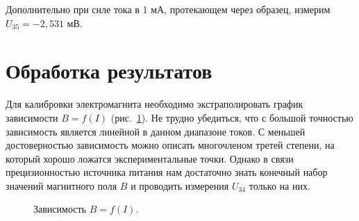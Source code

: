 \documentclass[a4paper,12pt]{article} %
\begin{document}
Дополнительно при силе тока в 1 мА, протекающем через образец, измерим $U_{35} = -2,531$ мВ.
		
\newpage
\section {Обработка результатов}
	Для калибровки электромагнита необходимо экстраполировать график зависимости $B = f(I)$ (рис.~\ref{ris:B=f(I)}). Не трудно убедиться, что с большой точностью зависимость является линейной в данном диапазоне токов. С меньшей достоверностью зависимость можно описать многочленом третей степени, на который хорошо ложатся экспериментальные точки. Однако в связи прецизионностью источника питания нам достаточно знать конечный набор значений магнитного поля $B$ и проводить измерения $U_{34}$ только на них.
	\begin{figure}[H]
		\caption{Зависимость $B = f(I)$.}
		\label{ris:B=f(I)}
	\end{figure}
\end{document}

